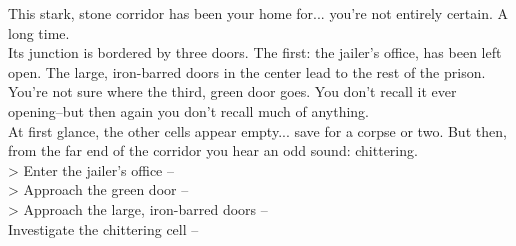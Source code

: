 This stark, stone corridor has been your home for... you’re not entirely certain. A long time.\\

Its junction is bordered by three doors. The first: the jailer’s office, has been left open. The large, iron-barred doors in the center lead to the rest of the prison. You’re not sure where the third, green door goes. You don’t recall it ever opening--but then again you don’t recall much of anything.\\

At first glance, the other cells appear empty... save for a corpse or two. But then, from the far end of the corridor you hear an odd sound: chittering.\\

> Enter the jailer’s office -- \\
> Approach the green door -- \\
> Approach the large, iron-barred doors -- \\
 Investigate the chittering cell -- 